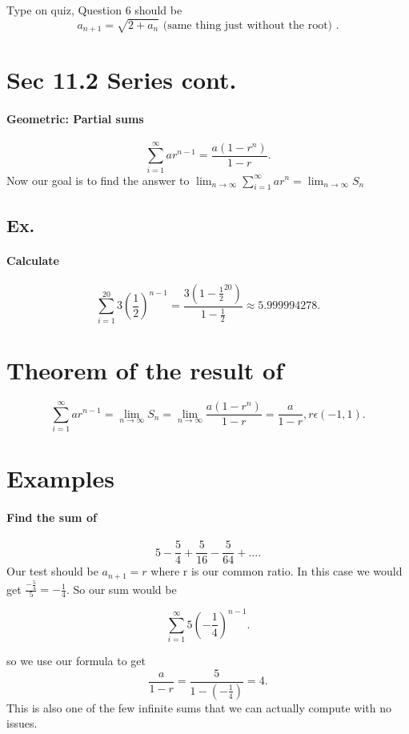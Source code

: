 Type on quiz, Question 6 should be 
\[
a_{ n+1 }=\sqrt{ 2+a_n} \text{ (same thing just without the root) }
.\] 
\section*{Sec 11.2 Series cont.}%

\paragraph{Geometric: Partial sums}
\[
\sum_{ i=1 } ^{ \infty } ar^{ n-1 }=\frac{ a\left( 1-r^{ n } \right)  }{ 1-r }
.\] 
Now our goal is to find the answer to 
$\lim_{ n \to \infty} \sum_{ i=1 } ^{ \infty } ar^{ n }=\lim_{ n \to \infty} S_n$
\subsection{Ex.}%
\label{sub:Ex.}
\paragraph{Calculate}
\[
\sum_{ i=1 } ^{ 20 } 3\left( \frac{ 1 }{ 2 }  \right) ^{ n-1 }=\frac{ 3\left( 1-\frac{ 1 }{ 2 }^{ 20 }  \right)  }{ 1-\frac{ 1 }{ 2 }  }	\approx 5.999994278
.\] 

\section{Theorem of the result of }%
\label{sec:Theorem of the result of }
\[
\sum_{ i=1 } ^{ \infty } ar^{ n-1 }=\lim_{ n \to \infty} S_n=\lim_{ n \to \infty} \frac{ a\left( 1-r^{ n } \right)  }{ 1-r }=\frac{ a }{ 1-r } ,r\epsilon\left( -1,1 \right) 
.\] 

\section{Examples}%
\label{sec:Examples}
\paragraph{Find the sum of }
\[
5-\frac{ 5 }{ 4 } +\frac{ 5 }{ 16 } -\frac{ 5 }{ 64 } + \ldots
.\] 
Our test should be $ a_{ n+1 } = r $ where r is our common ratio. In this case we would get $ \frac{ -\frac{ 5 }{ 4 }  }{ 5 } = -\frac{ 1 }{ 4 } $. So our sum would be

\[
\sum_{ i=1 } ^{ \infty } 5\left( -\frac{ 1 }{ 4 }  \right) ^{ n-1 }
.\] 

so we use our formula to get
\[
\frac{ a }{ 1-r } =\frac{ 5 }{ 1-\left( -\frac{ 1 }{ 4 }  \right)  } =4
.\] 
This is also one of the few infinite sums that we can actually compute with no issues. 

